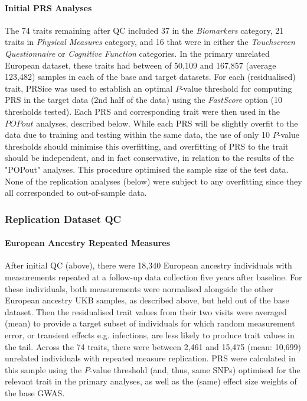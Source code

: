 \documentclass[12pt]{zHenriquesLab-StyleBioRxiv}
\begin{document}
\paragraph*{Initial PRS Analyses}
The 74 traits remaining after QC included 37 in the \textit{Biomarkers} category, 
21 traits in \textit{Physical Measures} category, and 16 that were in either 
the \textit{Touchscreen Questionnaire} or \textit{Cognitive Function} categories.  
In the primary unrelated European dataset, these traits had between of 50,109 and 167,857 
(average 123,482) samples in each of the base and target datasets. For each (residualised) trait, 
PRSice \cite{prsice} was used to establish an optimal $P$-value threshold for computing PRS in 
the target data (2nd half of the data) using the \textit{FastScore} option (10 thresholds tested). 
Each PRS and corresponding trait were then used in the $POPout$ analyses, described below. 
While each PRS will be slightly overfit to the data due to training and testing within the same data, 
the use of only 10 $P$-value thresholds should minimise this overfitting, and overfitting of PRS 
to the trait should be independent, and in fact conservative, in relation to the results of 
the "POPout" analyses. This procedure optimised the sample size of the test data. None of the replication 
analyses (below) were subject to any overfitting since they all corresponded to out-of-sample data. 
%
\subsubsection*{Replication Dataset QC} \label{sec:methods:rqc} 
\paragraph*{European Ancestry Repeated Measures}
After initial QC (above), there were 18,340 European ancestry individuals 
with measurements repeated at a follow-up data collection five years after baseline. 
For these individuals, both measurements were normalised alongside 
the other European ancestry UKB samples, as described above, but held out of the base dataset. Then 
the residualised trait values from their two visits were averaged (mean) to provide a 
target subset of individuals for which random measurement error, or transient 
effects e.g. infections, are less likely to produce trait values in the tail. 
Across the 74 traits, there were between 2,461 and 15,475 (mean: 10,699) unrelated 
individuals with repeated measure replication.  PRS were calculated in this sample 
using the $P$-value threshold (and, thus, same SNPs) optimised for the relevant 
trait in the primary analyses, as well as the (same) effect size weights of the base GWAS. 
%
\end{document}

